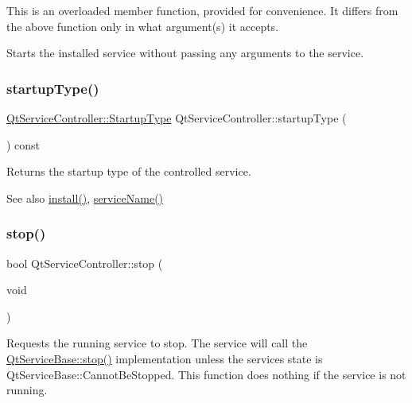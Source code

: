 This is an overloaded member function, provided for convenience. It differs from the above function only in what argument(s) it accepts.

Starts the installed service without passing any arguments to the service. \mbox{\label{class_qt_service_controller_acfd3b5cb23c17bf415f1d606b8461109}} 
\subsubsection{\texorpdfstring{startup\+Type()}{startupType()}}
{\footnotesize\ttfamily \hyperlink{class_qt_service_controller_a946ac2b079d9760503da923c2eaf0aac}{Qt\+Service\+Controller\+::\+Startup\+Type} Qt\+Service\+Controller\+::startup\+Type (\begin{DoxyParamCaption}{ }\end{DoxyParamCaption}) const}

Returns the startup type of the controlled service.

\begin{DoxySeeAlso}{See also}
\hyperlink{class_qt_service_controller_a7e2b85e911ff152557dd25959e76094b}{install()}, \hyperlink{class_qt_service_controller_a3df972ecd01a00fff5cda316ae35cbea}{service\+Name()} 
\end{DoxySeeAlso}
\mbox{\label{class_qt_service_controller_ad06afa647666769e309474b18bf7cf90}} 
\subsubsection{\texorpdfstring{stop()}{stop()}}
{\footnotesize\ttfamily bool Qt\+Service\+Controller\+::stop (\begin{DoxyParamCaption}\item[{void}]{ }\end{DoxyParamCaption})}

Requests the running service to stop. The service will call the \hyperlink{class_qt_service_base_a8d52c1b8fd06b50bdc0a0c6f9936a68e}{Qt\+Service\+Base\+::stop()} implementation unless the service\textquotesingle{}s state is Qt\+Service\+Base\+::\+Cannot\+Be\+Stopped. This function does nothing if the service is not running.

